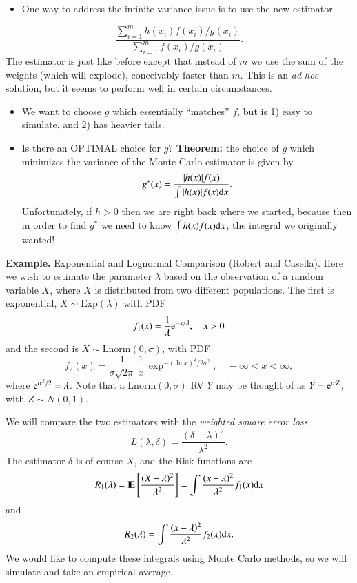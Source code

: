 \documentclass[captions=tableheading]{scrbook}
\begin{document}
\vspace{1in}


\begin{itemize}
\item One way to address the infinite variance issue is to use the new estimator
\end{itemize}
\[
\frac{\sum_{i=1}^{m}h(x_{i})f(x_{i})/g(x_{i})}{\sum_{i=1}^{m}f(x_{i})/g(x_{i})}.
\]
The estimator is just like before except that instead of $m$ we use the sum of the weights (which will explode), conceivably faster than $m$. This is an \emph{ad hoc} solution, but it seems to perform well in certain circumstances. 


\begin{itemize}
\item We want to choose $g$ which essentially ``matches'' $f$, but is 1) easy to simulate, and 2) has heavier tails.
\item Is there an OPTIMAL choice for $g$? \textbf{Theorem:} the choice of $g$ which minimizes the variance of the Monte Carlo estimator is given by 
   \[
   g^{\ast}(x)=\frac{|h(x)|f(x)}{\int|h(x)|f(x)\mathrm{d} x}.
   \]
   Unfortunately, if $h > 0$ then we are right back where we started, because then in order to find $g^{\ast}$ we need to know $\int h(x)f(x)\mathrm{d} x$, the integral we originally wanted!
\end{itemize}

\textbf{Example.} Exponential and Lognormal Comparison (Robert and Casella). Here we wish to estimate the parameter $\lambda$ based on the observation of a random variable $X$, where $X$ is distributed from two different populations. The first is exponential, $X\sim\mathrm{Exp}(\lambda)$ with PDF 
\[
f_{1}(x)=\frac{1}{\lambda}\mathrm{e}^{-x/\lambda},\quad x>0
\]
 and the second is $X\sim\mathrm{Lnorm}(0,\sigma)$, with PDF
\[
f_{2}(x)=\frac{1}{\sigma\sqrt{2\pi}}\,\frac{1}{x}\,\exp^{-(\ln x)^{2}/2\sigma^{2}},\quad-\infty<x<\infty,
\]
where $\mathrm{e}^{\sigma^{2}/2}=\lambda$. Note that a $\mathrm{Lnorm}(0,\sigma)$ RV $Y$ may be thought of as $Y=\mathrm{e}^{\sigma Z}$, with $Z \sim N(0,1)$.

We will compare the two estimators with the \emph{weighted square error loss} 
\[
L(\lambda,\delta)=\frac{(\delta-\lambda)^{2}}{\lambda^{2}}.
\]
The estimator $\delta$ is of course $X$, and the Risk functions are 
\[
R_{1}(\lambda)=\mathrm{I\hspace{-1.5pt}E}\left[\frac{(X-\lambda)^{2}}{\lambda^{2}}\right]=\int\frac{(x-\lambda)^{2}}{\lambda^{2}}f_{1}(x)\mathrm{d} x
\]
and 
\[
R_{2}(\lambda)=\int\frac{(x - \lambda)^{2}}{\lambda^{2}}f_{2}(x)\mathrm{d} x.
\]
We would like to compute these integrals using Monte Carlo methods, so we will simulate and take an empirical average.  
\end{document}
